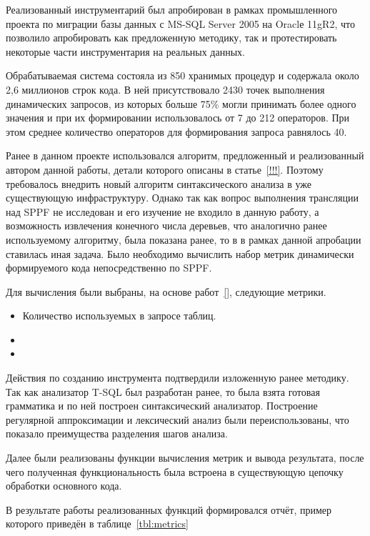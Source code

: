 Реализованный инструментарий был апробирован в рамках промышленного проекта по миграции базы данных с MS-SQL Server 2005 на Oraclе 11gR2, что позволило апробировать как предложенную методику, так и протестировать некоторые части инструментария на реальных данных.

Обрабатываемая система состояла из 850 хранимых процедур и содержала около 2,6 миллионов строк кода. В ней присутствовало 2430 точек выполнения динамических запросов, из которых больше 75\% могли принимать более одного значения и при их формировании использовалось от 7 до 212 операторов. При этом среднее количество операторов для формирования запроса равнялось 40.

Ранее в данном проекте использовался алгоритм, предложенный и реализованный автором данной работы, детали которого описаны в статье~\ref{!!!}. Поэтому требовалось внедрить новый алгоритм синтаксического анализа в уже существующую инфраструктуру. Однако так как вопрос выполнения трансляции над SPPF не исследован и его изучение не входило в данную работу, а возможность извлечения конечного числа деревьев, что аналогично ранее используемому алгоритму, была показана ранее, то в в рамках данной апробации ставилась иная задача. Было необходимо вычислить набор метрик динамически формируемого кода непосредственно по SPPF. 

Для вычисления были выбраны, на основе работ~\ref{}, следующие метрики.
\begin{itemize}
    \item Количество используемых в запросе таблиц.
    \item    
    \item 
\end{itemize}

Действия по созданию инструмента подтвердили изложенную ранее методику. Так как анализатор T-SQL был разработан ранее, то была взята готовая грамматика и по ней построен синтаксический анализатор. Построение регулярной аппроксимации и лексический анализ были переиспользованы, что показало преимущества разделения шагов анализа.

Далее были реализованы функции вычисления метрик и вывода результата, после чего полученная функциональность была встроена в существующую цепочку обработки основного кода.

В результате работы реализованных функций формировался отчёт, пример которого приведён в таблице~\ref{tbl:metrics}

